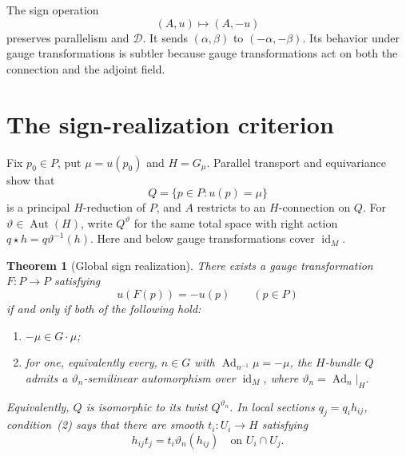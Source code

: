 \documentclass[11pt]{amsart}
\newcommand{\Ad}{\operatorname{Ad}}
\newcommand{\id}{\operatorname{id}}
\theoremstyle{plain}
\newtheorem{theorem}{Theorem}[section]
\theoremstyle{definition}
\theoremstyle{remark}
\begin{document}
The sign operation
\begin{equation}
 (A,u)\longmapsto(A,-u)
\end{equation}
preserves parallelism and $\mathcal D$.  It sends $(\alpha,\beta)$ to $(-\alpha,-\beta)$.  Its behavior under gauge transformations is subtler because gauge transformations act on both the connection and the adjoint field.

\section{The sign-realization criterion}\label{sec:sign}

Fix $p_0\in P$, put $\mu=u(p_0)$ and $H=G_\mu$.  Parallel transport and equivariance show that
\begin{equation}
 Q=\{p\in P:u(p)=\mu\}
\end{equation}
is a principal $H$-reduction of $P$, and $A$ restricts to an $H$-connection on $Q$.  For $\vartheta\in\operatorname{Aut}(H)$, write $Q^\vartheta$ for the same total space with right action $q\star h=q\vartheta^{-1}(h)$.  Here and below gauge transformations cover $\id_M$.

\begin{theorem}[Global sign realization]\label{thm:signcriterion}
There exists a gauge transformation $F:P\to P$ satisfying
\begin{equation}\label{eq:signgauge}
 u(F(p))=-u(p)\qquad(p\in P)
\end{equation}
if and only if both of the following hold:
\begin{enumerate}
\item $-\mu\in G\cdot\mu$;
\item for one, equivalently every, $n\in G$ with $\Ad_{n^{-1}}\mu=-\mu$, the $H$-bundle $Q$ admits a $\vartheta_n$-semilinear automorphism over $\id_M$, where $\vartheta_n=\Ad_n|_H$.
\end{enumerate}
Equivalently, $Q$ is isomorphic to its twist $Q^{\vartheta_n}$.  In local sections $q_j=q_i h_{ij}$, condition~(2) says that there are smooth $t_i:U_i\to H$ satisfying
\begin{equation}\label{eq:cechsign}
 h_{ij}t_j=t_i\vartheta_n(h_{ij})
 \quad\text{on }U_i\cap U_j.
\end{equation}
\end{theorem}
\end{document}
